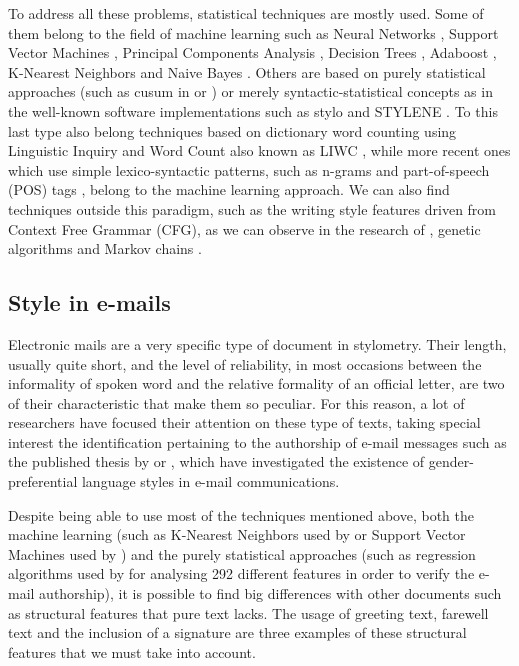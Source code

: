 To address all these problems, statistical techniques are mostly used. Some of them belong to the field of machine learning such as Neural Networks \citep{ng1997feature}, Support Vector Machines \citep{abbasi2005applying}, Principal Components Analysis \citep{PCAstyle}, Decision Trees \citep{apte1998text}, Adaboost \citep{cheng2011author}, K-Nearest Neighbors \citep{kucukyilmaz2008chat} and Naive Bayes \citep{sahami1998bayesian}. Others are based on purely statistical approaches (such as cusum in \cite{summers1999analysing} or \cite{thisted1987did}) or merely syntactic-statistical concepts as in the well-known software implementations such as stylo \citep{stylor} and STYLENE \citep{stylene}. To this last type also belong techniques based on dictionary word counting using Linguistic Inquiry and Word Count also known as LIWC \citep{liwc2015}, while more recent ones which use simple lexico-syntactic patterns, such as n-grams and part-of-speech (POS) tags \citep{mihalcea2009lie, ott2011finding}, belong to the machine learning approach. We can also find techniques outside this paradigm, such as the writing style features driven from Context Free Grammar (CFG), as we can observe in the research of \cite{cfgstylo}, genetic algorithms \citep{holmes1995federalist} and Markov chains \citep{tweedie1998variable}.

\subsection{Style in e-mails}\label{ssect:styloemail}
Electronic mails are a very specific type of document in stylometry. Their length, usually quite short, and the level of reliability, in most occasions between the informality of spoken word and the relative formality of an official letter, are two of their characteristic that make them so peculiar. For this reason, a lot of researchers have focused their attention on these type of texts, taking special interest the identification pertaining to the authorship of e-mail messages such as the published thesis by \cite{corney2003analysing} or \cite{thomson2001predicting}, which have investigated the existence of gender-preferential language styles in e-mail communications.

Despite being able to use most of the techniques mentioned above, both the machine learning (such as K-Nearest Neighbors used by \cite{calix2008stylometry} or Support Vector Machines used by \cite{de2001mining}) and the purely statistical approaches (such as regression algorithms used by \cite{iqbal2010mining} for analysing 292 different features in order to verify the e-mail authorship), it is possible to find big differences with other documents such as structural features that pure text lacks. The usage of greeting text, farewell text and the inclusion of a signature are three examples of these structural features that we must take into account.

